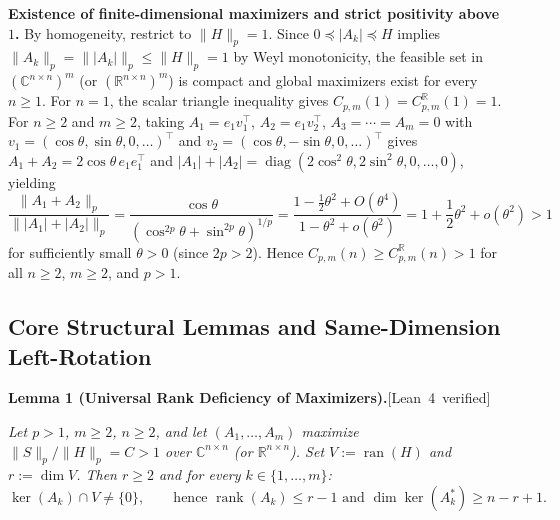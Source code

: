 \documentclass[10pt,letterpaper]{article}
\newcommand{\leanbadge}[1]{\mbox{\sffamily\scriptsize\color{leanborder}[#1]}}
\newcommand{\C}{\mathbb{C}}
\newcommand{\R}{\mathbb{R}}
\newcommand{\ran}{\operatorname{ran}}
\newcommand{\rank}{\operatorname{rank}}
\newcommand{\diag}{\operatorname{diag}}
\begin{document}
\textbf{Existence of finite-dimensional maximizers and strict positivity above~$1$.}
By homogeneity, restrict to $\|H\|_p = 1$. Since $0 \preceq |A_k| \preceq H$ implies $\|A_k\|_p = \||A_k|\|_p \le \|H\|_p = 1$ by Weyl monotonicity, the feasible set in $(\C^{n\times n})^m$ (or $(\R^{n\times n})^m$) is compact and global maximizers exist for every $n \ge 1$. For $n = 1$, the scalar triangle inequality gives $C_{p,m}(1) = C_{p,m}^{\R}(1) = 1$. For $n \ge 2$ and $m \ge 2$, taking $A_1 = e_1 v_1^\top$, $A_2 = e_1 v_2^\top$, $A_3 = \cdots = A_m = 0$ with $v_1 = (\cos\theta, \sin\theta, 0,\dots)^\top$ and $v_2 = (\cos\theta, -\sin\theta, 0,\dots)^\top$ gives $A_1 + A_2 = 2\cos\theta\,e_1 e_1^\top$ and $|A_1|+|A_2| = \diag(2\cos^2\theta, 2\sin^2\theta, 0,\dots,0)$, yielding
\[
  \frac{\|A_1 + A_2\|_p}{\||A_1| + |A_2|\|_p}
  = \frac{\cos\theta}{(\cos^{2p}\theta + \sin^{2p}\theta)^{1/p}}
  = \frac{1 - \frac{1}{2}\theta^2 + O(\theta^4)}{1 - \theta^2 + o(\theta^2)}
  = 1 + \frac{1}{2}\theta^2 + o(\theta^2) > 1
\]
for sufficiently small $\theta > 0$ (since $2p > 2$). Hence $C_{p,m}(n) \ge C_{p,m}^{\R}(n) > 1$ for all $n \ge 2$, $m \ge 2$, and $p > 1$.

\subsection{Core Structural Lemmas and Same-Dimension Left-Rotation}

\begin{tcolorbox}[lemmabox]
\textbf{Lemma 1 (Universal Rank Deficiency of Maximizers).}\hfill\leanbadge{Lean~4 verified}\par\vspace{1.5pt}
\emph{Let $p > 1$, $m \ge 2$, $n \ge 2$, and let $(A_1,\dots,A_m)$ maximize $\|S\|_p / \|H\|_p = C > 1$ over $\C^{n\times n}$ (or $\R^{n\times n}$). Set $V := \ran(H)$ and $r := \dim V$. Then $r \ge 2$ and for every $k \in \{1,\dots,m\}$:}
\[
  \ker(A_k) \cap V \neq \{0\}, \qquad \text{hence } \rank(A_k) \le r - 1 \text{ and } \dim\ker(A_k^*) \ge n - r + 1.
\]
\end{tcolorbox}
\end{document}
